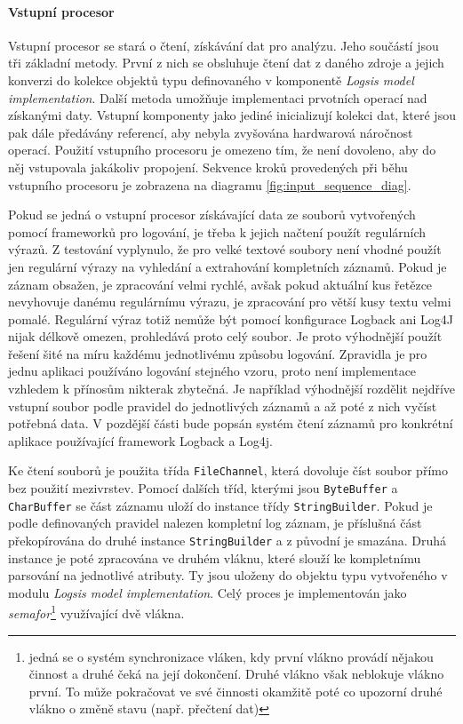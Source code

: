 \documentclass[ing,male,java,dept460]{diploma}		%
\begin{document}
\paragraph{Vstupní procesor}
Vstupní procesor se stará o čtení, získávání dat pro analýzu. Jeho součástí jsou tři základní metody. První z nich se obsluhuje čtení dat z daného zdroje a jejich konverzi do kolekce objektů typu definovaného v komponentě \textit{Logsis model implementation}. Další metoda umožňuje implementaci prvotních operací nad získanými daty. Vstupní komponenty jako jediné inicializují kolekci dat, které jsou pak dále předávány referencí, aby nebyla zvyšována hardwarová náročnost operací. Použití vstupního procesoru je omezeno tím, že není dovoleno, aby do něj vstupovala jakákoliv propojení. Sekvence kroků provedených při běhu vstupního procesoru je zobrazena na diagramu \ref{fig:input_sequence_diag}.
\par Pokud se jedná o vstupní procesor získávající data ze souborů vytvořených pomocí frameworků pro logování, je třeba k jejich načtení použít regulárních výrazů. Z testování vyplynulo, že pro velké textové soubory není vhodné použít jen regulární výrazy na vyhledání a extrahování kompletních záznamů. Pokud je záznam obsažen, je zpracování velmi rychlé, avšak pokud aktuální kus řetězce nevyhovuje danému regulárnímu výrazu, je zpracování pro větší kusy textu velmi pomalé. Regulární výraz totiž nemůže být pomocí konfigurace Logback ani Log4J nijak délkově omezen, prohledává proto celý soubor. Je proto výhodnější použít řešení šité na míru každému jednotlivému způsobu logování. Zpravidla je pro jednu aplikaci používáno logování stejného vzoru, proto není implementace vzhledem k přínosům nikterak zbytečná. Je například výhodnější rozdělit nejdříve vstupní soubor podle pravidel do jednotlivých záznamů a až poté z nich vyčíst potřebná data. V pozdější části bude popsán systém čtení záznamů pro konkrétní aplikace používající framework Logback a Log4j.
\par Ke čtení souborů je použita třída \texttt{FileChannel}, která dovoluje číst soubor přímo bez použití mezivrstev. Pomocí dalších tříd, kterými jsou \texttt{ByteBuffer} a \texttt{CharBuffer} se část záznamu uloží do instance třídy \texttt{StringBuilder}. Pokud je podle definovaných pravidel nalezen kompletní log záznam, je příslušná část překopírována do druhé instance \texttt{StringBuilder} a z původní je smazána. Druhá instance je poté zpracována ve druhém vláknu, které slouží ke kompletnímu parsování na jednotlivé atributy. Ty jsou uloženy do objektu typu vytvořeného v modulu \textit{Logsis model implementation}. Celý proces je implementován jako \textit{semafor}\footnote{jedná se o systém synchronizace vláken, kdy první vlákno provádí nějakou činnost a druhé čeká na její dokončení. Druhé vlákno však neblokuje vlákno první. To může pokračovat ve své činnosti okamžitě poté co upozorní druhé vlákno o změně stavu (např. přečtení dat)} využívající dvě vlákna.
\end{document}
